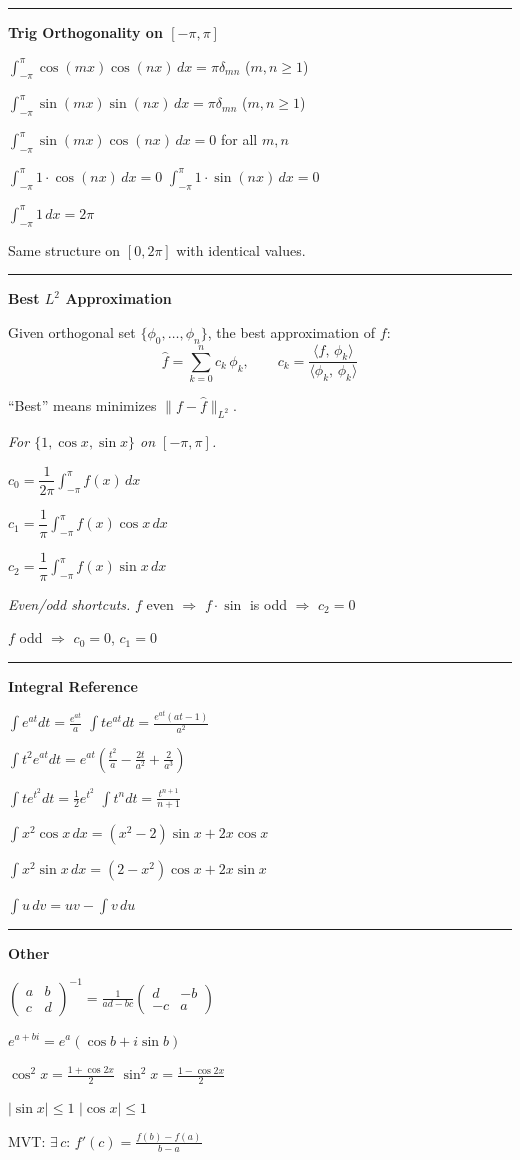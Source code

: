 \documentclass[10pt]{article}
\newcommand{\norm}[1]{\|#1\|}
\newcommand{\inner}[2]{\langle #1,\,#2 \rangle}
\newcommand{\mat}[1]{\begin{pmatrix}#1\end{pmatrix}}
\newcommand{\heading}[1]{\bigskip\hrule\vspace{5pt}\textbf{#1}\vspace{8pt}\par}
\newcommand{\sub}[1]{\bigskip\textit{#1.}\;}
\newlength{\colw}
\begin{document}
\begin{minipage}[t]{\colw}

  \heading{Trig Orthogonality on $[-\pi,\pi]$}

  $\displaystyle\int_{-\pi}^{\pi}\cos(mx)\cos(nx)\,dx=\pi\delta_{mn}$ \quad ($m,n\ge1$)

  $\displaystyle\int_{-\pi}^{\pi}\sin(mx)\sin(nx)\,dx=\pi\delta_{mn}$ \quad ($m,n\ge1$)

  $\displaystyle\int_{-\pi}^{\pi}\sin(mx)\cos(nx)\,dx=0$ \quad for all $m,n$

  $\displaystyle\int_{-\pi}^{\pi}1\cdot\cos(nx)\,dx=0$ \qquad $\displaystyle\int_{-\pi}^{\pi}1\cdot\sin(nx)\,dx=0$

  $\displaystyle\int_{-\pi}^{\pi}1\,dx=2\pi$

  Same structure on $[0,2\pi]$ with identical values.

  \heading{Best $L^2$ Approximation}

  Given orthogonal set $\{\phi_0,\ldots,\phi_n\}$, the best approximation of $f$:
  $$\hat{f}=\sum_{k=0}^n c_k\,\phi_k, \qquad c_k=\frac{\inner{f}{\phi_k}}{\inner{\phi_k}{\phi_k}}$$

  ``Best'' means minimizes $\norm{f-\hat{f}}_{L^2}$.

  \sub{For $\{1,\cos x,\sin x\}$ on $[-\pi,\pi]$}

  $c_0=\dfrac{1}{2\pi}\displaystyle\int_{-\pi}^{\pi}f(x)\,dx$

  $c_1=\dfrac{1}{\pi}\displaystyle\int_{-\pi}^{\pi}f(x)\cos x\,dx$

  $c_2=\dfrac{1}{\pi}\displaystyle\int_{-\pi}^{\pi}f(x)\sin x\,dx$

  \sub{Even/odd shortcuts} $f$ even $\Rightarrow$ $f\cdot\sin$ is odd $\Rightarrow$ $c_2=0$

  $f$ odd $\Rightarrow$ $c_0=0$, $c_1=0$

  \heading{Integral Reference}

  $\int e^{at}dt=\frac{e^{at}}{a}$ \qquad $\int te^{at}dt=\frac{e^{at}(at-1)}{a^2}$

  $\int t^2e^{at}dt=e^{at}\!\left(\frac{t^2}{a}-\frac{2t}{a^2}+\frac{2}{a^3}\right)$

  $\int te^{t^2}dt=\frac{1}{2}e^{t^2}$ \qquad $\int t^ndt=\frac{t^{n+1}}{n+1}$

  $\int x^2\cos x\,dx=(x^2-2)\sin x+2x\cos x$

  $\int x^2\sin x\,dx=(2-x^2)\cos x+2x\sin x$

  $\int u\,dv=uv-\int v\,du$

  \heading{Other}


  $\mat{a&b\\c&d}^{-1}=\frac{1}{ad-bc}\mat{d&-b\\-c&a}$

  {\setlength{\parskip}{8pt}
    $e^{a+bi}=e^a(\cos b+i\sin b)$

    $\cos^2x=\frac{1+\cos2x}{2}$ \qquad $\sin^2x=\frac{1-\cos2x}{2}$

    $|\sin x|\le1$ \qquad $|\cos x|\le1$

    MVT: $\exists\,c$: $f'(c)=\frac{f(b)-f(a)}{b-a}$
  }

\end{minipage}
\end{document}
